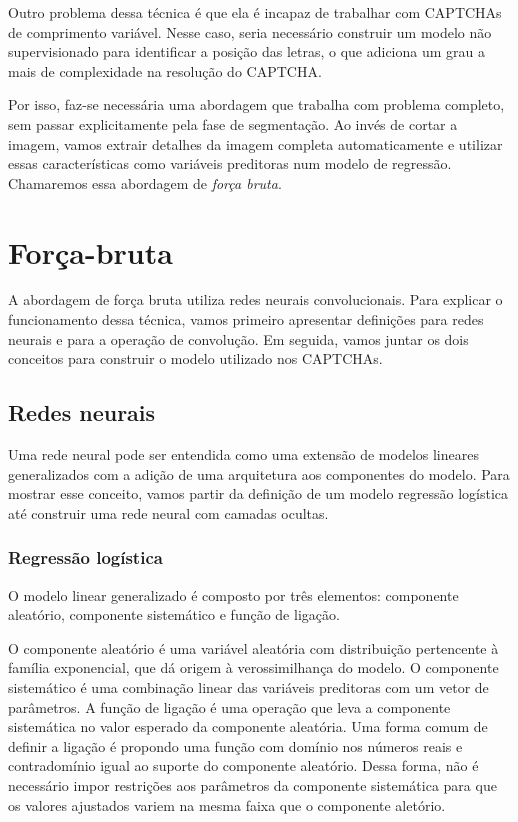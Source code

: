 \documentclass[12pt,]{report}
\begin{document}
Outro problema dessa técnica é que ela é incapaz de trabalhar com CAPTCHAs de comprimento variável. Nesse caso, seria necessário construir um modelo não supervisionado para identificar a posição das letras, o que adiciona um grau a mais de complexidade na resolução do CAPTCHA.

Por isso, faz-se necessária uma abordagem que trabalha com problema completo, sem passar explicitamente pela fase de segmentação. Ao invés de cortar a imagem, vamos extrair detalhes da imagem completa automaticamente e utilizar essas características como variáveis preditoras num modelo de regressão. Chamaremos essa abordagem de \emph{força bruta}.

\hypertarget{foruxe7a-bruta}{%
\section{Força-bruta}\label{foruxe7a-bruta}}

A abordagem de força bruta utiliza redes neurais convolucionais. Para explicar o funcionamento dessa técnica, vamos primeiro apresentar definições para redes neurais e para a operação de convolução. Em seguida, vamos juntar os dois conceitos para construir o modelo utilizado nos CAPTCHAs.

\hypertarget{redes-neurais}{%
\subsection{Redes neurais}\label{redes-neurais}}

Uma rede neural pode ser entendida como uma extensão de modelos lineares generalizados com a adição de uma arquitetura aos componentes do modelo. Para mostrar esse conceito, vamos partir da definição de um modelo regressão logística até construir uma rede neural com camadas ocultas.

\hypertarget{regressuxe3o-loguxedstica}{%
\subsubsection{Regressão logística}\label{regressuxe3o-loguxedstica}}

O modelo linear generalizado é composto por três elementos: componente aleatório, componente sistemático e função de ligação.

O componente aleatório é uma variável aleatória com distribuição pertencente à família exponencial, que dá origem à verossimilhança do modelo. O componente sistemático é uma combinação linear das variáveis preditoras com um vetor de parâmetros. A função de ligação é uma operação que leva a componente sistemática no valor esperado da componente aleatória. Uma forma comum de definir a ligação é propondo uma função com domínio nos números reais e contradomínio igual ao suporte do componente aleatório. Dessa forma, não é necessário impor restrições aos parâmetros da componente sistemática para que os valores ajustados variem na mesma faixa que o componente aletório.
\end{document}
